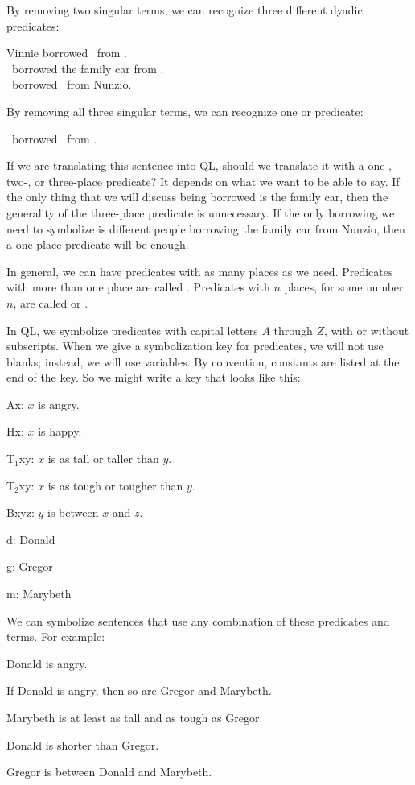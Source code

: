 By removing two singular terms, we can recognize three different dyadic predicates:
\begin{center}
Vinnie borrowed \blank\ from \blank.\\
\blank\ borrowed the family car from \blank.\\
\blank\ borrowed \blank\ from Nunzio.
\end{center}

By removing all three singular terms, we can recognize one  or  predicate:
\begin{center}
\blank\ borrowed \blank\ from \blank.
\end{center}

If we are translating this sentence into QL, should we translate it with a one-, two-, or three-place predicate? It depends on what we want to be able to say. If the only thing that we will discuss being borrowed is the family car, then the generality of the three-place predicate is unnecessary. If the only borrowing we need to symbolize is different people borrowing the family car from Nunzio, then a one-place predicate will be enough.

In general, we can have predicates with as many places as we need. Predicates with more than one place are called . Predicates with $n$ places, for some number $n$, are called  or .

In QL, we symbolize predicates with capital letters $A$ through $Z$, with or without subscripts. When we give a symbolization key for predicates, we will not use blanks; instead, we will use variables. By convention, constants are listed at the end of the key. So we might write a key that looks like this:
\begin{ekey}
\item[Ax:] $x$ is angry.
\item[Hx:] $x$ is happy.
\item[T$_1$xy:] $x$ is as tall or taller than $y$.
\item[T$_2$xy:] $x$ is as tough or tougher than $y$.
\item[Bxyz:] $y$ is between $x$ and $z$.
\item[d:] Donald
\item[g:] Gregor
\item[m:] Marybeth
\end{ekey}

We can symbolize sentences that use any combination of these predicates and terms. For example:
\begin{earg}
\item[\ex{terms1}] Donald is angry.
\item[\ex{terms2}] If Donald is angry, then so are Gregor and Marybeth.
\item[\ex{terms3}] Marybeth is at least as tall and as tough as Gregor.
\item[\ex{terms4}] Donald is shorter than Gregor.
\item[\ex{terms5}] Gregor is between Donald and Marybeth.
\end{earg}

